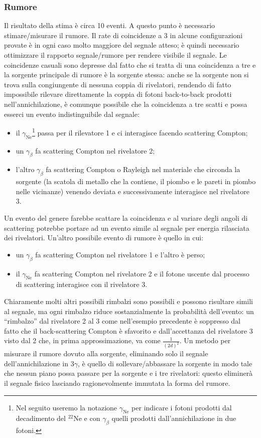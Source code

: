 \subsubsection{Rumore}
Il risultato della stima è circa 10 eventi. A questo punto è necessario stimare/misurare il rumore.
Il rate di coincidenze a 3 in alcune configurazioni provate è in ogni caso molto maggiore del segnale atteso; è quindi necessario ottimizzare il rapporto segnale/rumore per rendere visibile il segnale.
Le coincidenze casuali sono depresse dal fatto che si tratta di una coincidenza a tre e la sorgente principale di rumore è la sorgente stessa: 
anche se la sorgente non si trova sulla congiungente di nessuna coppia di rivelatori, rendendo di fatto impossibile rilevare direttamente la coppia di fotoni back-to-back prodotti nell'annichilazione, è comunque possibile che la coincidenza a tre scatti e possa esserci un evento indistinguibile dal segnale:
\begin{itemize}
	\item il $\gamma_{\text{Ne}}$\footnote{Nel seguito useremo la notazione $\gamma_{\text{Ne}}$ per indicare i fotoni prodotti dal decadimento del $^{22}\text{Ne}$ e con $\gamma_{\beta}$ quelli prodotti dall'annichilazione in due fotoni.} passa per il rilevatore 1 e ci interagisce facendo scattering Compton;
	\item un $\gamma_{\beta}$ fa scattering Compton nel rivelatore 2;
	\item l'altro $\gamma_{\beta}$ fa scattering Compton o Rayleigh nel materiale che circonda la sorgente (la scatola di metallo che la contiene, il piombo e le pareti in piombo nelle vicinanze) venendo deviata e successivamente interagisce nel rivelatore 3.
\end{itemize}
Un evento del genere farebbe scattare la coincidenza e al variare degli angoli di scattering potrebbe portare ad un evento simile al segnale per energia rilasciata dei rivelatori. Un'altro possibile evento di rumore è quello in cui:
\begin{itemize}
	\item un $\gamma_{\beta}$ fa scattering Compton nel rivelatore 1 e l'altro è perso;
	\item il $\gamma_{\text{Ne}}$ fa scattering Compton nel rivelatore 2 e il fotone uscente dal processo di scattering interagisce con il rivelatore 3.
\end{itemize}
Chiaramente molti altri possibili rimbalzi sono possibili e possono risultare simili al segnale, ma ogni rimbalzo riduce sostanzialmente la probabilità dell'evento: un ``rimbalzo'' dal rivelatore 2 al 3 come nell'esempio precedente è soppresso dal fatto che il back-scattering Compton è sfavorito e dall'accettanza del rivelatore 3 visto dal 2 che, in prima approssimazione, va come $\frac{1}{(2d)^2}$.
Un metodo per misurare il rumore dovuto alla sorgente, eliminando solo il segnale dell'annichilazione in $3\gamma$, è quello di sollevare/abbassare la sorgente in modo tale che nessun piano possa passare per la sorgente e i tre rivelatori: questo eliminerà il segnale fisico lasciando ragionevolmente immutata la forma del rumore.
